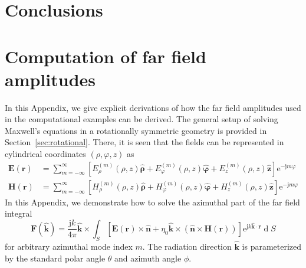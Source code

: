 \documentclass[a4paper,12pt]{article}
\renewcommand{\vec}[1]{\boldsymbol{#1}}
\newcommand{\unitvec}[1]{\hat{\vec{#1}}}
\newcommand{\mrm}[1]{\mathrm{#1}}
\newcommand{\diff}{\operatorname{d}\!}
\newcommand{\ju}{\mrm{j}}
\newcommand{\eu}{\mrm{e}}
\newcommand{\Ev}{\vec{E}}
\newcommand{\Hv}{\vec{H}}
\newcommand{\Fv}{\vec{F}}
\newcommand{\rv}{\vec{r}}
\newcommand{\zuv}{\unitvec{z}}
\newcommand{\nuv}{\unitvec{n}}
\newcommand{\kuv}{\unitvec{k}}
\newcommand{\rhouv}{\unitvec{\rho}}
\newcommand{\varphiuv}{\unitvec{\varphi}}
\begin{document}
\section{Conclusions}
\label{sec:conclusions}



\newpage

\appendix

\section{Computation of far field amplitudes}
\label{app:farfield}

In this Appendix, we give explicit derivations of how the far field
amplitudes used in the computational examples can be derived. The
general setup of solving Maxwell's equations in a rotationally
symmetric geometry is provided in Section~\ref{sec:rotational}. There,
it is seen that the fields can be represented in cylindrical
coordinates $(\rho,\varphi,z)$ as
\begin{align}
  \Ev(\rv) &= \sum_{m=-\infty}^{\infty} \left[E_{\rho}^{(m)}(\rho,z)\rhouv + E_{\varphi}^{(m)}(\rho,z)\varphiuv + E_{z}^{(m)}(\rho,z)\zuv \right] \eu^{-\ju m\varphi} \\
  \Hv(\rv) &= \sum_{m=-\infty}^{\infty} \left[H_{\rho}^{(m)}(\rho,z)\rhouv + H_{\varphi}^{(m)}(\rho,z)\varphiuv + H_{z}^{(m)}(\rho,z)\zuv \right] \eu^{-\ju m\varphi}
\end{align}
In this Appendix, we demonstrate how to solve the azimuthal part of
the far field integral 
\begin{equation}
  \Fv(\kuv) = \frac{\ju k}{4\pi} \kuv\times \int_{S} \left[ \Ev(\rv)\times\nuv + \eta_{0}\kuv\times(\nuv\times\Hv(\rv)) \right] \eu^{\ju k\kuv\cdot\rv} \diff S
\end{equation}
for arbitrary azimuthal mode index $m$. The radiation direction $\kuv$
is parameterized by the standard polar angle $\theta$ and azimuth
angle $\phi$.
\end{document}
